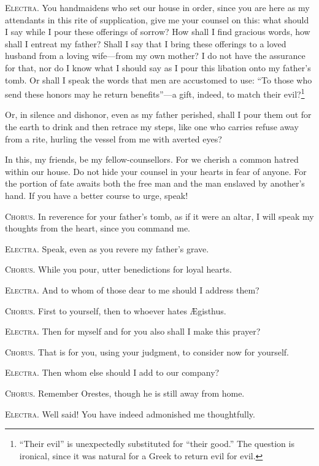 \documentclass[12pt]{article}
\begin{document}
\textsc{Electra.} You handmaidens who set our house in order, since you are here as my attendants in this rite of supplication, give me your counsel on this: what should I say while I pour these offerings of sorrow? How shall I find gracious words, how shall I entreat my father? Shall I say that I bring these offerings to a loved husband from a loving wife---from my own mother? I do not have the assurance for that, nor do I know what I should say as I pour this libation onto my father's tomb. Or shall I speak the words that men are accustomed to use: ``To those who send these honors may he return benefits''---a gift, indeed, to match their evil?\footnote{\-``Their evil'' is unexpectedly substituted for ``their good.'' The question is ironical, since it was natural for a Greek to return evil for evil.}

Or, in silence and dishonor, even as my father perished, shall I pour them out for the earth to drink and then retrace my steps, like one who carries refuse away from a rite, hurling the vessel from me with averted eyes?

In this, my friends, be my fellow-counsellors. For we cherish a common hatred within our house. Do not hide your counsel in your hearts in fear of anyone. For the portion of fate awaits both the free man and the man enslaved by another's hand. If you have a better course to urge, speak!

\textsc{Chorus.} In reverence for your father's tomb, as if it were an altar, I will speak my thoughts from the heart, since you command me.

\textsc{Electra.} Speak, even as you revere my father's grave.

\textsc{Chorus.} While you pour, utter benedictions for loyal hearts.

\textsc{Electra.} And to whom of those dear to me should I address them?

\textsc{Chorus.} First to yourself, then to whoever hates {\AE}gisthus.

\textsc{Electra.} Then for myself and for you also shall I make this prayer?

\textsc{Chorus.} That is for you, using your judgment, to consider now for yourself.

\textsc{Electra.} Then whom else should I add to our company?

\textsc{Chorus.} Remember Orestes, though he is still away from home.

\textsc{Electra.} Well said! You have indeed admonished me thoughtfully.
\end{document}
